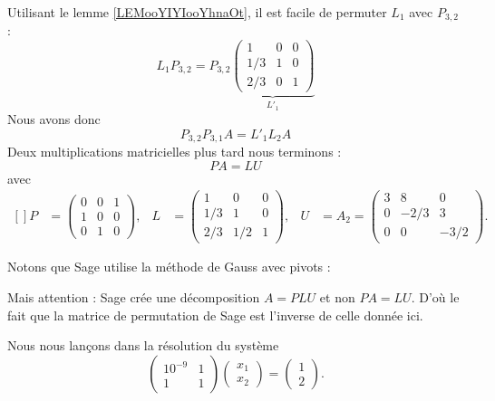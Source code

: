 \begin{example}
    Utilisant le lemme \ref{LEMooYIYIooYhnaOt}, il est facile de permuter \( L_{1}\) avec \( P_{3,2}\) :
    \begin{equation}
        L_1P_{3,2}=P_{3,2}
        \underbrace{
        \begin{pmatrix}
            1    &   0    &   0    \\
            1/3    &   1    &   0    \\
            2/3    &   0    &   1
        \end{pmatrix}}_{L'_1}
    \end{equation}
    Nous avons donc
    \begin{equation}
        P_{3,2}P_{3,1}A=L'_1L_2A
    \end{equation}
    Deux multiplications matricielles plus tard nous terminons :
    \begin{equation}
        PA=LU
    \end{equation}
    avec
    \begin{equation}
        \begin{aligned}[]
        P&=\begin{pmatrix}
            0    &   0    &   1    \\
            1    &   0    &   0    \\
            0    &   1    &   0
        \end{pmatrix},&
        L&=\begin{pmatrix}
            1    &   0    &   0    \\
            1/3    &   1    &   0    \\
            2/3    &   1/2    &   1
        \end{pmatrix},&
        U&=A_2=\begin{pmatrix}
            3    &   8    &   0    \\
            0    &   -2/3    &   3    \\
            0    &   0    &   -3/2
        \end{pmatrix}.
        \end{aligned}
    \end{equation}
\end{example}

Notons que Sage utilise la méthode de Gauss avec pivots :

Mais attention : Sage crée une décomposition \( A=PLU\) et non \( PA=LU\). D'où le fait que la matrice de permutation de Sage est l'inverse de celle donnée ici.

Nous nous lançons dans la résolution du système
\begin{equation}
    \begin{pmatrix}
        10^{-9}    &   1    \\ 
        1    &   1    
    \end{pmatrix}\begin{pmatrix}
        x_1    \\ 
        x_2    
    \end{pmatrix}=\begin{pmatrix}
        1    \\ 
        2    
    \end{pmatrix}.
\end{equation}

